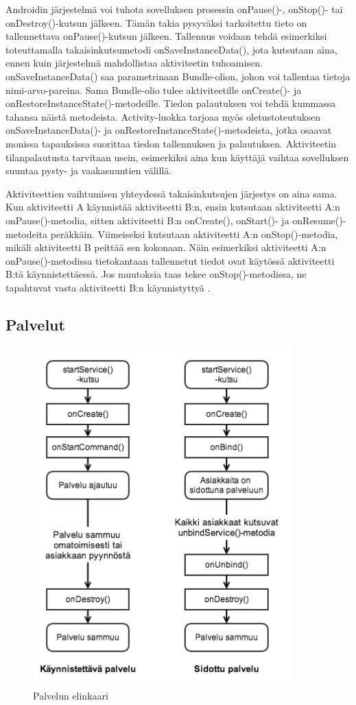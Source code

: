 Androidin järjestelmä voi tuhota sovelluksen prosessin onPause()-, onStop()- tai onDestroy()-kutsun jälkeen. Tämän takia pysyväksi tarkoitettu tieto on tallennettava onPause()-kutsun jälkeen. Tallennus voidaan tehdä esimerkiksi toteuttamalla takaisinkutsumetodi onSaveInstanceData(), jota kutsutaan aina, ennen kuin järjestelmä mahdollistaa aktiviteetin tuhoamisen. onSaveInstanceData() saa parametrinaan Bundle-olion, johon voi tallentaa tietoja nimi-arvo-pareina. Sama Bundle-olio tulee aktiviteetille onCreate()- ja onRestoreInstanceState()-metodeille. Tiedon palautuksen voi tehdä kummassa tahansa näistä metodeista. Activity-luokka tarjoaa myös oletustoteutuksen onSaveInstanceData()- ja onRestoreInstanceState()-metodeista, jotka osaavat monissa tapauksissa suorittaa tiedon tallennuksen ja palautuksen. Aktiviteetin tilanpalautusta tarvitaan usein, esimerkiksi aina kun käyttäjä vaihtaa sovelluksen suuntaa pysty- ja vaakasuuntien välillä.

Aktiviteettien vaihtumisen yhteydessä takaisinkutsujen järjestys on aina sama. Kun aktiviteetti A käynnistää aktiviteetti B:n, ensin kutsutaan aktiviteetti A:n onPause()-metodia, sitten aktiviteetti B:n onCreate(), onStart()- ja onResume()-metodeita peräkkäin. Viimeiseksi kutsutaan aktiviteetti A:n onStop()-metodia, mikäli aktiviteetti B peittää sen kokonaan. Näin esimerkiksi aktiviteetti A:n onPause()-metodissa tietokantaan tallennetut tiedot ovat käytössä aktiviteetti B:tä käynnistettäessä. Jos muutoksia taas tekee onStop()-metodissa, ne tapahtuvat vasta aktiviteetti B:n käynnistyttyä \cite{android}.

\subsection{Palvelut}

\begin{figure}[h]
\centering
\includegraphics[width=100mm]{service_lifecycle.png}
\caption{Palvelun elinkaari \protect\cite{android}} \label{service_lifecycle}
\end{figure}

